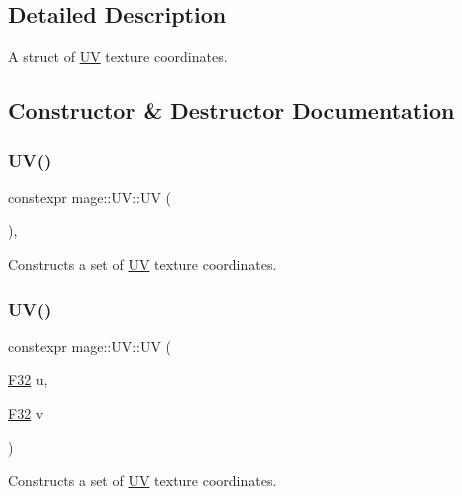 \subsection{Detailed Description}
A struct of \mbox{\hyperlink{structmage_1_1_u_v}{UV}} texture coordinates. 

\subsection{Constructor \& Destructor Documentation}
\mbox{\label{structmage_1_1_u_v_adc1ec1943378b391e1eeba840070b62c}} 
\subsubsection{\texorpdfstring{U\+V()}{UV()}\hspace{0.1cm}{\footnotesize\ttfamily [1/5]}}
{\footnotesize\ttfamily constexpr mage\+::\+U\+V\+::\+UV (\begin{DoxyParamCaption}{ }\end{DoxyParamCaption})\hspace{0.3cm}{\ttfamily [default]}, {\ttfamily [noexcept]}}

Constructs a set of \mbox{\hyperlink{structmage_1_1_u_v}{UV}} texture coordinates. \mbox{\label{structmage_1_1_u_v_a383d9dff35f65343ea90284a07581b1f}} 
\subsubsection{\texorpdfstring{U\+V()}{UV()}\hspace{0.1cm}{\footnotesize\ttfamily [2/5]}}
{\footnotesize\ttfamily constexpr mage\+::\+U\+V\+::\+UV (\begin{DoxyParamCaption}\item[{\mbox{\hyperlink{namespacemage_aa97e833b45f06d60a0a9c4fc22ae02c0}{F32}}}]{u,  }\item[{\mbox{\hyperlink{namespacemage_aa97e833b45f06d60a0a9c4fc22ae02c0}{F32}}}]{v }\end{DoxyParamCaption})\hspace{0.3cm}{\ttfamily [noexcept]}}

Constructs a set of \mbox{\hyperlink{structmage_1_1_u_v}{UV}} texture coordinates.


